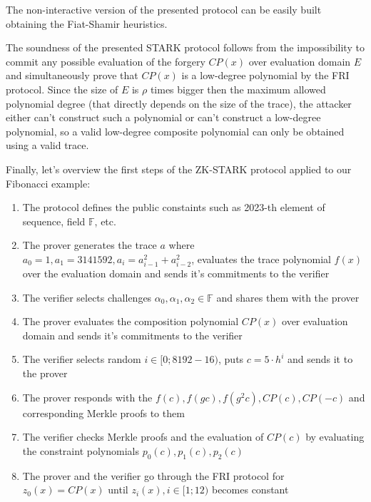 \documentclass[../lecture-notes.tex]{subfiles}
\begin{document}
The non-interactive version of the presented protocol can be easily built obtaining the Fiat-Shamir heuristics.

The soundness of the presented STARK protocol follows from the impossibility to commit any possible evaluation of the forgery $CP(x)$ over evaluation domain $E$ and simultaneously prove that $CP(x)$ is a low-degree polynomial by the FRI protocol. Since the size of $E$ is $\rho$ times bigger then the maximum allowed polynomial degree (that directly depends on the size of the trace), the attacker either can't construct such a polynomial or can't construct a low-degree polynomial, so a valid low-degree composite polynomial can only be obtained using a valid trace.

\begin{example}
    Finally, let's overview the first steps of the ZK-STARK protocol applied to our Fibonacci example:
    
    \begin{enumerate}
        \item The protocol defines the public constaints such as 2023-th element of sequence, field $\mathbb{F}$, etc.
        \item The prover generates the trace $a$ where $a_0 = 1, a_1 = 3141592, a_i = a_{i-1}^2 + a_{i-2}^2$, 
        evaluates the trace polynomial $f(x)$ over the evaluation domain and sends it's commitments to the verifier 
        \item The verifier selects challenges $\alpha_0, \alpha_1, \alpha_2 \in \mathbb{F}$ and shares them with the prover
        \item The prover evaluates the composition polynomial $CP(x)$ over evaluation domain and sends it's commitments to the verifier 
        \item The verifier selects random $i \in [0; 8192-16)$, puts $c = 5\cdot h^i$ and sends it to the prover
        \item The prover responds with the $f(c), f(gc), f(g^2c), CP(c), CP(-c)$ and corresponding Merkle proofs to them
        \item The verifier checks Merkle proofs and the evaluation of $CP(c)$ by evaluating the constraint polynomials $p_0(c), p_1(c), p_2(c)$
        \item The prover and the verifier go through the FRI protocol for $z_0(x) = CP(x)$ until $z_i(x), i \in [1;12)$ becomes constant
    \end{enumerate}
    
\end{example}
\end{document}

